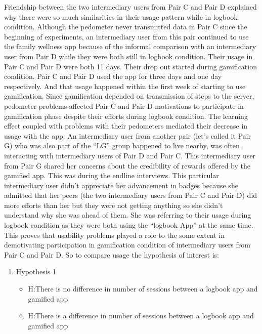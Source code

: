 Friendship between the two intermediary users from Pair C and Pair D explained why there were so much similarities in their usage pattern while in logbook condition. Although the pedometer never transmitted data in Pair C  since the beginning of experiments, an intermediary user from this pair continued to use the family wellness app because of the informal comparison with an intermediary user from Pair D while they were both still in logbook condition. Their usage in Pair C and Pair D were both 11 days. Their drop out started during gamification condition. Pair C and Pair D used the app for three days and one day respectively. And that usage happened within the first week of starting to use gamification. Since gamification depended on transmission of steps to the server, pedometer problems affected Pair C and Pair D motivations to participate in gamification phase despite their efforts during logbook condition. The learning effect coupled with problems with their pedometers mediated their decrease in usage with the app. An intermediary user from another pair (let's called it Pair G) who was also part of the ``LG'' group happened to live nearby, was often interacting with intermediary users of Pair D and Pair C. This intermediary user from Pair G shared her concerns about the credibility of rewards offered by the gamified app. This was during the endline interviews. This particular intermediary user didn't appreciate her advancement in badges because she admitted that her peers (the two intermediary users from Pair C and Pair D) did more efforts than her but they were not getting anything so she didn't understand why she was ahead of them. She was referring to their usage during logbook condition as they were both using the ``logbook App'' at the same time.  This proves that usability problems played a role to the some extent in demotivating participation in gamification condition  of intermediary users from Pair C and Pair D. So to compare usage the hypothesis of interest is:

\begin{enumerate}
\item{Hypothesis 1}
\begin{itemize}
\item{H}:There is no difference in number of sessions between a logbook app and gamified app
\item{H}:There is a difference in number of sessions between a logbook app and gamified app
\end{itemize}
\end{enumerate}

